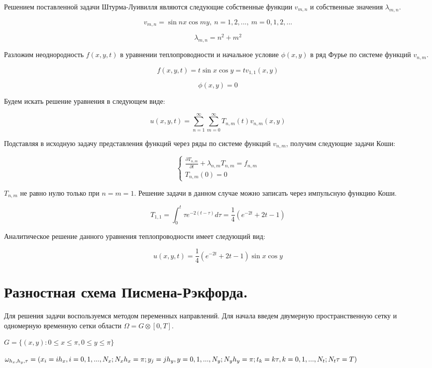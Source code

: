 \documentclass[a4paper,14pt]{article}
\begin{document}
Решением поставленной задачи Штурма-Луивилля являются следующие собственные функции $v_{m, n}$ и собственные значения $\lambda_{m, n}$.

$$v_{m,n}=\sin nx \cos my,\ n=1,2,..., \ m = 0,1,2,...$$

$$\lambda_{m, n}=n^2+m^2$$

Разложим неоднородность $f(x,y,t)$ в уравнении теплопроводности и начальное условие $\phi(x,y)$ в ряд Фурье по системе функций $v_{n,m}$.

$$f(x, y, t) = t \sin x \cos y = t v_{1,1}(x,y)$$

$$\phi(x,y) = 0$$

\noindent Будем искать решение уравнения в следующем виде:

$$u(x,y,t)=\sum\limits_{n=1}^{\infty} \sum\limits_{m=0}^{\infty} T_{n,m}(t)v_{n,m}(x,y)$$

\noindent Подставляя в исходную задачу представления функций через ряды по системе функций $v_{n,m}$, получим следующие задачи Коши:

\begin{equation*}
\begin{cases}
   \frac{\partial T_{n,m}}{\partial t}+\lambda_{n,m}T_{n,m} = f_{n,m}\\
   T_{n,m}(0)=0
 \end{cases}
\end{equation*}


\noindent $T_{n,m}$ не равно нулю только при $n=m=1$. Решение задачи в данном случае можно записать через импульсную функцию Коши.

$$T_{1,1}=\int_0^t \tau e^{-2(t-\tau)} d\tau=\frac{1}{4}(e^{-2t}+2t-1)$$

\noindent Аналитическое решение данного уравнения теплопроводности имеет следующий вид:

$$u(x,y,t)=\frac{1}{4}(e^{-2t}+2t-1)\sin x \cos y$$

\section{Разностная схема Писмена-Рэкфорда.}
Для решения задачи воспользуемся методом переменных направлений. Для начала введем двумерную пространственную сетку и одномерную временную сетки области $\Omega = G\otimes [0,T]$.

\noindent $G=\{(x,y): 0\leq x \leq \pi,0\leq y \leq \pi\}$

\noindent $\omega_{h_x,h_y,\tau}=(x_i=ih_x, i=0,1,...,N_x; N_x h_x=\pi;\\
y_j=jh_y, y=0,1,...,N_y; N_y h_y=\pi;\\
t_k=k\tau, k=0,1,...,N_t; N_t \tau=T)$
\end{document}
